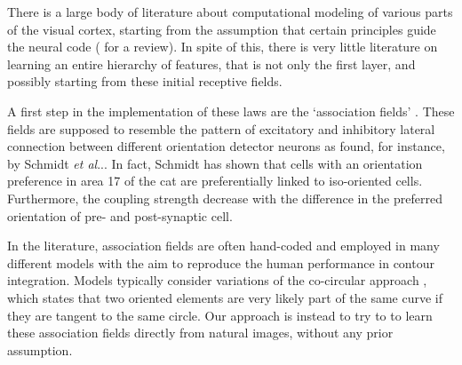 \documentclass{llncs}
\makeatletter
\DeclareRobustCommand\onedot{\futurelet\@let@token\@onedot}
\def\@onedot{\ifx\@let@token.\else.\null\fi\xspace}
\def\etal{\emph{et al}\onedot}
\makeatother
\begin{document}

There is a large body of literature about computational modeling
of various parts of the visual cortex, starting from the assumption that
certain principles guide the neural code (\cite{SimoncelliO01} for a review).
In spite of this, there is very little literature on learning an entire
hierarchy of features, that is not only the first layer, and possibly
starting from these initial receptive fields.

A first step in the implementation of these laws are the `association fields'
\cite{FieldHH93}. These fields are supposed to resemble the pattern of
excitatory and inhibitory lateral connection between different orientation
detector neurons as found, for instance, by Schmidt \etal \cite{SchmidtGLS97}.
In fact, Schmidt has shown that cells with an orientation preference in area
17 of the cat are preferentially linked to iso-oriented cells. Furthermore,
the coupling strength decrease with the difference in the preferred
orientation of pre- and post-synaptic cell.

In the literature, association fields are often hand-coded and employed in
many different models with the aim to reproduce the human performance in
contour integration. Models typically consider variations of the co-circular
approach \cite{Grossberg85,Guy96,Li98}, which states that two oriented elements are
very likely part of the same curve if they are tangent to the same circle.
Our approach is instead to try to to learn these
association fields directly from natural images, without any prior assumption.

\end{document}
